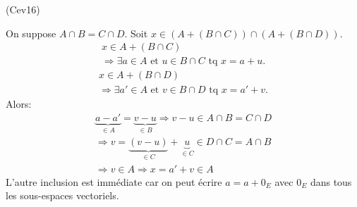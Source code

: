 \begin{tiny}(Cev16)\end{tiny} On suppose $A\cap B = C\cap D$.\newline
Soit $x \in \left(A+(B\cap C) \right) \cap \left(A+(B\cap D) \right)$.
\begin{multline*}
  x \in A+(B\cap C) \\ \Rightarrow \exists a\in A \text{ et } u\in B\cap C \text{ tq } x = a+u.
\end{multline*}
\begin{multline*}
x \in A+(B\cap D) \\ \Rightarrow \exists a'\in A \text{ et } v\in B\cap D\text{ tq } x = a'+v . 
\end{multline*}
Alors:
\begin{multline*}
  \underset{\in A}{\underbrace{a-a'}} = \underset{\in B}{\underbrace{v-u}}
\Rightarrow v-u \in A\cap B = C \cap D \\
\Rightarrow v = \underset{\in C}{\underbrace{(v-u)}} + \underset{\in C}{\underbrace{u}} \in D \cap C = A\cap B \\
\Rightarrow v \in A \Rightarrow x = a' + v \in A
\end{multline*}
L'autre inclusion est immédiate car on peut écrire $a=a+0_E$ avec $0_E$ dans tous les sous-espaces vectoriels.

